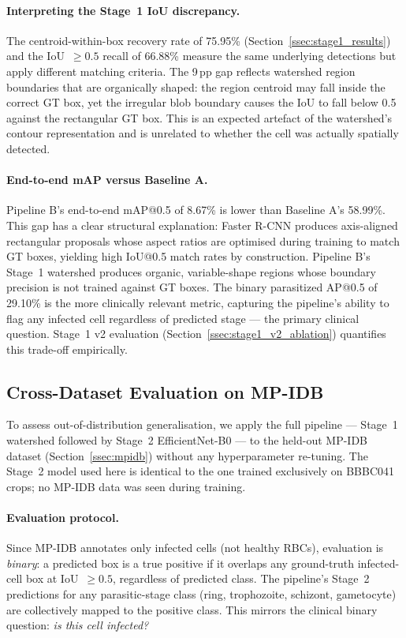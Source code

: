 \documentclass[review,12pt]{elsarticle}
\begin{document}
\paragraph{Interpreting the Stage~1 IoU discrepancy.}
The centroid-within-box recovery rate of 75.95\%
(Section~\ref{ssec:stage1_results}) and the IoU~$\geq 0.5$ recall of
66.88\% measure the same underlying detections but apply different
matching criteria. The 9\,pp gap reflects watershed region boundaries
that are organically shaped: the region centroid may fall inside the
correct GT box, yet the irregular blob boundary causes the IoU to fall
below 0.5 against the rectangular GT box. This is an expected artefact
of the watershed's contour representation and is unrelated to whether the
cell was actually spatially detected.

\paragraph{End-to-end mAP versus Baseline A.}
Pipeline B's end-to-end mAP@0.5 of 8.67\% is lower than Baseline A's
58.99\%. This gap has a clear structural explanation: Faster R-CNN
produces axis-aligned rectangular proposals whose aspect ratios are
optimised during training to match GT boxes, yielding high IoU@0.5 match
rates by construction. Pipeline B's Stage~1 watershed produces organic,
variable-shape regions whose boundary precision is not trained against GT
boxes. The binary parasitized AP@0.5 of 29.10\% is the more clinically
relevant metric, capturing the pipeline's ability to flag any infected cell
regardless of predicted stage --- the primary clinical question.
Stage~1 v2 evaluation (Section~\ref{ssec:stage1_v2_ablation}) quantifies
this trade-off empirically.

\subsection{Cross-Dataset Evaluation on MP-IDB}
\label{ssec:mpidb_results}

To assess out-of-distribution generalisation, we apply the full pipeline
--- Stage~1 watershed followed by Stage~2 EfficientNet-B0 --- to the
held-out MP-IDB dataset (Section~\ref{ssec:mpidb}) without any
hyperparameter re-tuning. The Stage~2 model used here is identical to the
one trained exclusively on BBBC041 crops; no MP-IDB data was seen during
training.

\paragraph{Evaluation protocol.}
Since MP-IDB annotates only infected cells (not healthy RBCs), evaluation
is \textit{binary}: a predicted box is a true positive if it overlaps any
ground-truth infected-cell box at IoU~$\geq 0.5$, regardless of predicted
class. The pipeline's Stage~2 predictions for any parasitic-stage class
(ring, trophozoite, schizont, gametocyte) are collectively mapped to the
positive class. This mirrors the clinical binary question: \emph{is this
cell infected?}
\end{document}
